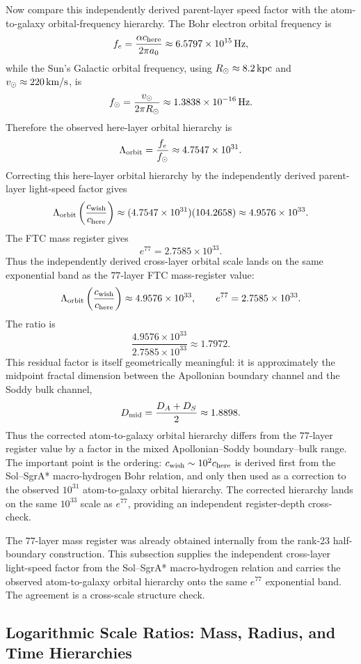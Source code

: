 \documentclass[11pt,a4paper]{article}
\begin{document}
Now compare this independently derived parent-layer speed factor with the atom-to-galaxy orbital-frequency hierarchy. The Bohr electron orbital frequency is
\[
f_e
=
\frac{\alpha c_{\rm here}}{2\pi a_0}
\approx
6.5797\times10^{15}\,{\rm Hz},
\]
while the Sun's Galactic orbital frequency, using \(R_\odot\approx8.2\,{\rm kpc}\) and \(v_\odot\approx220\,{\rm km/s}\), is
\[
f_\odot
=
\frac{v_\odot}{2\pi R_\odot}
\approx
1.3838\times10^{-16}\,{\rm Hz}.
\]
Therefore the observed here-layer orbital hierarchy is
\[
\Lambda_{\rm orbit}
=
\frac{f_e}{f_\odot}
\approx
4.7547\times10^{31}.
\]
Correcting this here-layer orbital hierarchy by the independently derived parent-layer light-speed factor gives
\[
\Lambda_{\rm orbit}
\left(\frac{c_{\rm wish}}{c_{\rm here}}\right)
\approx
(4.7547\times10^{31})(104.2658)
\approx
4.9576\times10^{33}.
\]
The FTC mass register gives
\[
e^{77}
=
2.7585\times10^{33}.
\]
Thus the independently derived cross-layer orbital scale lands on the same exponential band as the \(77\)-layer FTC mass-register value:
\[
\Lambda_{\rm orbit}\left(\frac{c_{\rm wish}}{c_{\rm here}}\right)
\approx
4.9576\times10^{33},
\qquad
e^{77}
=
2.7585\times10^{33}.
\]
The ratio is
\[
\frac{4.9576\times10^{33}}{2.7585\times10^{33}}
\approx
1.7972.
\]
This residual factor is itself geometrically meaningful: it is approximately the midpoint fractal dimension between the Apollonian boundary channel and the Soddy bulk channel,
\[
D_{\rm mid}
=
\frac{D_A+D_S}{2}
\approx
1.8898.
\]
Thus the corrected atom-to-galaxy orbital hierarchy differs from the \(77\)-layer register value by a factor in the mixed Apollonian--Soddy boundary--bulk range. The important point is the ordering: \(c_{\rm wish}\sim10^2c_{\rm here}\) is derived first from the Sol--SgrA* macro-hydrogen Bohr relation, and only then used as a correction to the observed \(10^{31}\) atom-to-galaxy orbital hierarchy. The corrected hierarchy lands on the same \(10^{33}\) scale as \(e^{77}\), providing an independent register-depth cross-check.

The \(77\)-layer mass register was already obtained internally from the rank-23 half-boundary construction. This subsection supplies the independent cross-layer light-speed factor from the Sol--SgrA* macro-hydrogen relation and carries the observed atom-to-galaxy orbital hierarchy onto the same \(e^{77}\) exponential band. The agreement is a cross-scale structure check.


\subsection{Logarithmic Scale Ratios: Mass, Radius, and Time Hierarchies}
\end{document}
